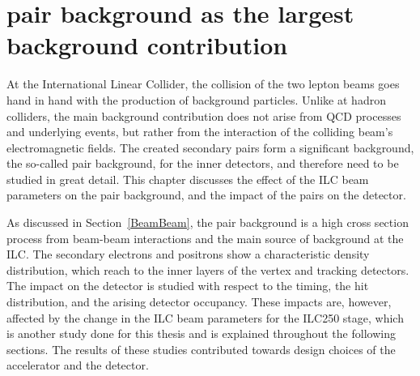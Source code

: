 \chapter{\positron\electron pair background as the largest background contribution}
\label{PairBkg}

\begin{chapterabstract}
 At the International Linear Collider, the collision of the two lepton beams goes hand in hand with the production of background particles.
 Unlike at hadron colliders, the main background contribution does not arise from QCD processes and underlying events, but rather from the interaction of the colliding beam's electromagnetic fields.
 The created secondary \positron\electron pairs form a significant background, the so-called pair background, for the inner detectors, and therefore need to be studied in great detail.
 This chapter discusses the effect of the ILC beam parameters on the pair background, and the impact of the \positron\electron pairs on the \sid detector.
\end{chapterabstract}

As discussed in Section~\ref{BeamBeam}, the pair background is a high cross section process from beam-beam interactions and the main source of background at the ILC.
The secondary electrons and positrons show a characteristic density distribution, which reach to the inner layers of the \sid vertex and tracking detectors.
The impact on the \sid detector is studied with respect to the timing, the hit distribution, and the arising detector occupancy.
These impacts are, however, affected by the change in the ILC beam parameters for the ILC250 stage, which is another study done for this thesis and is explained throughout the following sections.
The results of these studies contributed towards design choices of the accelerator and the \sid detector.


